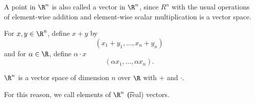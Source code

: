 

A point in $\R^n$ is also called a vector in $\R^n$, since $R^n$ with the usual operations of element-wise addition and element-wise scalar multiplication is a vector space.


For $x, y \in \R^n$, define $x + y$ by
\[
  (x_1 +y_1, \dots, x_n + y_n)
\]
and for $\alpha \in \R$, define $\alpha \cdot x$
\[
  (\alpha x_1, \dots, \alpha x_n).
\]

\begin{proposition}
  $\R^n$ is a vector space of dimension $n$ over $\R$ with $+$ and $\cdot$.
\end{proposition}

For this reason, we call elements of $\R^n$ \t{(real) vectors}.

\blankpage
